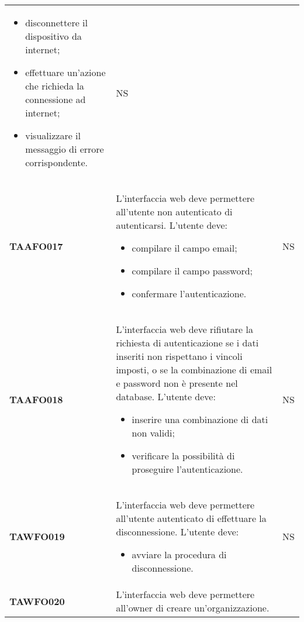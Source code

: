 \documentclass[../piano-di-qualifica.tex]{subfiles}
\begin{document}
\begin{centering}
\begin{longtable}[H]{>{\centering\bfseries}m{3cm} >{}p{10cm} >{\centering\arraybackslash}m{3cm}}
\begin{itemize}
                        \item disconnettere il dispositivo da internet;
                        \item effettuare un'azione che richieda la connessione ad internet;
                        \item visualizzare il messaggio di errore corrispondente.
                      \end{itemize}
                      & NS \\ 
        TAAFO017      & L’interfaccia web deve permettere all’utente non autenticato di autenticarsi. \newline 
                      L’utente deve:  
                      \begin{itemize} 
                        \item compilare il campo email;
                        \item compilare il campo password;
                        \item confermare l'autenticazione.
                      \end{itemize}
                      & NS \\ 
        TAAFO018      & L’interfaccia web deve rifiutare la richiesta di autenticazione se i dati inseriti non rispettano i vincoli imposti, o se la combinazione di email e password non è presente nel database. \newline 
                      L’utente deve:  
                      \begin{itemize} 
                        \item inserire una combinazione di dati non validi;
                        \item verificare la possibilità di proseguire l'autenticazione.
                      \end{itemize}
                      & NS \\ 
        TAWFO019      & L’interfaccia web deve permettere all’utente autenticato di effettuare la disconnessione. \newline
        L’utente deve: 
        \begin{itemize} 
         \item avviare la procedura di disconnessione. 
        \end{itemize}
        & NS \\
        TAWFO020      & L’interfaccia web deve permettere all’owner di creare un’organizzazione. \newline

\end{longtable}
\end{centering}
\end{document}
